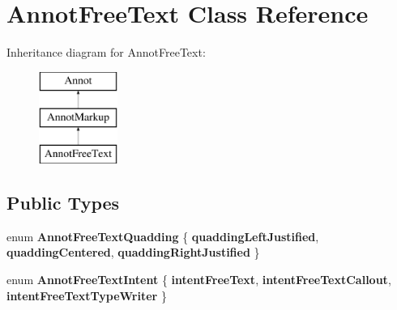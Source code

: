 \hypertarget{class_annot_free_text}{}\section{Annot\+Free\+Text Class Reference}
\label{class_annot_free_text}
Inheritance diagram for Annot\+Free\+Text\+:\begin{figure}[H]
\begin{center}
\leavevmode
\includegraphics[height=3.000000cm]{class_annot_free_text}
\end{center}
\end{figure}
\subsection*{Public Types}
\begin{DoxyCompactItemize}
\item 
\mbox{\label{class_annot_free_text_a39ae63f8d5c0e48e2fb21a68c9105ac9}} 
enum {\bfseries Annot\+Free\+Text\+Quadding} \{ {\bfseries quadding\+Left\+Justified}, 
{\bfseries quadding\+Centered}, 
{\bfseries quadding\+Right\+Justified}
 \}
\item 
\mbox{\label{class_annot_free_text_a56887a00cec17588ba239efa347ca09a}} 
enum {\bfseries Annot\+Free\+Text\+Intent} \{ {\bfseries intent\+Free\+Text}, 
{\bfseries intent\+Free\+Text\+Callout}, 
{\bfseries intent\+Free\+Text\+Type\+Writer}
 \}
\end{DoxyCompactItemize}
